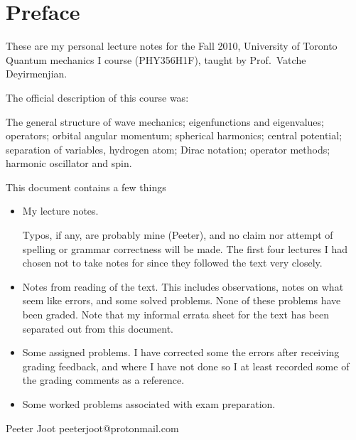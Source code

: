 %
%

%
%
\chapter*{Preface}%

These are my personal lecture notes for the Fall 2010, University of Toronto Quantum mechanics I course (PHY356H1F), taught by Prof.\ Vatche Deyirmenjian.

The official description of this course was:

The general structure of wave mechanics; eigenfunctions and eigenvalues; operators; orbital angular momentum; spherical harmonics; central potential; separation of variables, hydrogen atom; Dirac notation; operator methods; harmonic oscillator and spin.

This document contains a few things

\begin{itemize}
\item My lecture notes.

Typos, if any, are probably mine (Peeter), and no claim nor attempt of spelling or grammar correctness will be made.  The first four lectures I had chosen not to take notes for since they followed the text \citep{desai2009quantum} very closely.

\item Notes from reading of the text.  This includes observations, notes on what seem like errors, and some solved problems.  None of these problems have been graded.  Note that my informal errata sheet \citep{desaiTypos} for the text has been separated out from this document.

\item Some assigned problems.  I have corrected some the errors after receiving grading feedback, and where I have not done so I at least recorded some of the grading comments as a reference.

\item Some worked problems associated with exam preparation.

\end{itemize}

Peeter Joot  \quad peeterjoot@protonmail.com
